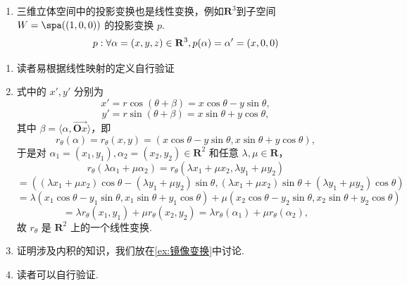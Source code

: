 \begin{example}{}{}
\begin{enumerate}
\begin{center}
        \end{center}
        \item 三维立体空间中的投影变换也是线性变换，例如$\mathbf{R}^3$到子空间 $W=\spa((1,0,0))$ 的投影变换 $p$.
        \[
        p: \forall \alpha = (x,y,z) \in \mathbf{R}^3,\\
        p(\alpha) = \alpha'= (x,0,0)
        \]
    \end{enumerate}

\end{example}

\begin{solution}
    \begin{enumerate}
     \item 读者易根据线性映射的定义自行验证
     \item 式中的 \( x', y' \) 分别为
     \[
     x' = r \cos(\theta + \beta) = x \cos \theta - y \sin \theta,
     \]
     \[
     y' = r \sin(\theta + \beta) = x \sin \theta + y \cos \theta,
     \]
     其中 \( \beta = \langle \alpha, \vec{\mathbf{O}x} \rangle \)，即
     \[
     r_{\theta}(\alpha) = r_{\theta}(x, y) = (x \cos \theta - y \sin \theta, x \sin \theta + y \cos \theta),
     \]
     于是对 \( \alpha_1 = (x_1, y_1), \alpha_2 = (x_2, y_2) \in \mathbf{R}^2 \) 和任意 \( \lambda, \mu \in \mathbf{R} \)，
     \[
     r_{\theta}(\lambda \alpha_1 + \mu \alpha_2) = r_{\theta}(\lambda x_1 + \mu x_2, \lambda y_1 + \mu y_2)
     \]
     \[
     = ((\lambda x_1 + \mu x_2) \cos \theta - (\lambda y_1 + \mu y_2) \sin \theta,
     (\lambda x_1 + \mu x_2) \sin \theta + (\lambda y_1 + \mu y_2) \cos \theta)
     \]
     \[
     = \lambda (x_1 \cos \theta - y_1 \sin \theta, x_1 \sin \theta + y_1 \cos \theta)
     + \mu (x_2 \cos \theta - y_2 \sin \theta, x_2 \sin \theta + y_2 \cos \theta)
     \]
     \[
     = \lambda r_{\theta}(x_1, y_1) + \mu r_{\theta}(x_2, y_2) = \lambda r_{\theta}(\alpha_1) + \mu r_{\theta}(\alpha_2),
     \]
     故 \( r_{\theta} \) 是 \( \mathbf{R}^2 \) 上的一个线性变换.

    \item 证明涉及内积的知识，我们放在\autoref{ex:镜像变换}中讨论.
    \item 读者可以自行验证.
    \end{enumerate}

\end{solution}

